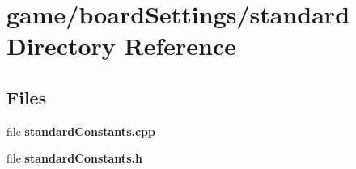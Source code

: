 \section{game/board\-Settings/standard Directory Reference}
\label{dir_4b215556390b6b138a71cb26c81340b7}
\subsection*{Files}
\begin{DoxyCompactItemize}
\item 
file {\bfseries standard\-Constants.\-cpp}
\item 
file {\bfseries standard\-Constants.\-h}
\end{DoxyCompactItemize}
